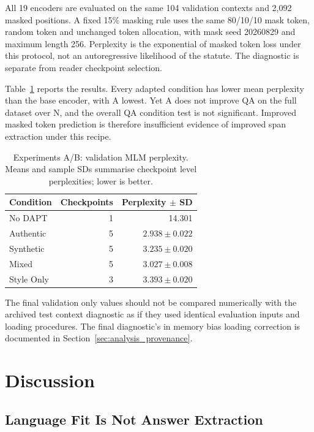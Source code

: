 \documentclass[pdflatex,sn-basic]{sn-jnl}
\begin{document}
All 19 encoders are evaluated on the same 104 validation contexts and 2,092
masked positions. A fixed 15\% masking rule uses the same 80/10/10
mask token, random token and unchanged token allocation, with mask seed
20260829 and maximum length 256. Perplexity is the exponential of masked token
loss under this protocol, not an autoregressive likelihood of the statute.
The diagnostic is separate from reader checkpoint selection.

Table~\ref{tab:final_mlm} reports the results. Every adapted condition has
lower mean perplexity than the base encoder, with A lowest. Yet A does not
improve QA on the full dataset over N, and the overall QA condition test is
not significant. Improved masked token prediction is therefore insufficient
evidence of improved span extraction under this recipe.

\begin{table}[!htbp]
\caption{Experiments A/B: validation MLM perplexity. Means and sample SDs
summarise checkpoint level perplexities; lower is better.}
\label{tab:final_mlm}
\centering
\begin{tabular}{@{}lrr@{}}
\toprule
Condition & Checkpoints & Perplexity $\pm$ SD \\
\midrule
No DAPT & 1 & 14.301 \\
Authentic & 5 & $2.938\pm0.022$ \\
Synthetic & 5 & $3.235\pm0.020$ \\
Mixed & 5 & $3.027\pm0.008$ \\
Style Only & 3 & $3.393\pm0.020$ \\
\bottomrule
\end{tabular}
\end{table}

The final validation only values should not be compared numerically with
the archived test context diagnostic as if they used identical evaluation
inputs and loading procedures. The final diagnostic's in memory bias loading
correction is documented in Section~\ref{sec:analysis_provenance}.

\FloatBarrier

\section{Discussion}\label{sec:discussion}

\subsection{Language Fit Is Not Answer Extraction}
\end{document}
